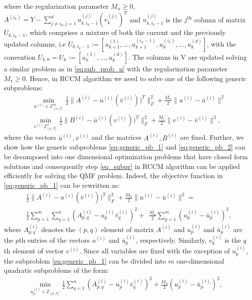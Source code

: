 \documentclass[lettersize,journal]{IEEEtran}
\begin{document}
where the regularization parameter $M_u \geq 0$,   $A^{(i_k)} = Y - \sum_{j \neq i_k, j=1}^d u_{k, i_k -1}^{(j)}  (v_k^{(j)})^T $ and  $u_{k, i_k -1}^{(j)}$ is the $j^{\text{th}}$ column of matrix $U_{k, i_k-1}$,  which comprises a mixture of both the current and the previously updated columns, i.e $U_{k, i_k-1} := [u_{k+1}^{(1)}, \ldots, u_{k+1}^{(i_k -1)}, u_{k}^{(i_k)}, \ldots , u_{k}^{(d)}]$, with the convention $U_{k, 0} = U_k:= [u_{k}^{(1)},\ldots, u_{k}^{(d)}]$. 
The columns in V are updated solving a similar problem as in \eqref{eq:sub_prob_u} with the regularization parameter $M_v \geq 0$. Hence, in RCCM algorithm we need to solve one of the following generic subproblems:
\begin{align}   
&\min_{u^{(i)} \in \mathbb{Z}_{[\alpha,\beta]}^{m}} \!\! \frac{1}{2} \|A^{(i)} \!- u^{(i)} (\bar v^{(i)}))^T \|_F^2 + \frac{M_u}{2} \| u^{(i)} \!- \bar{u}^{(i)} \|^2 \label{eq:generic_pb_1} \\
&\min_{v^{(i)} \mathbb{Z}_{[\alpha,\beta]}^{n}} \!\!  \frac{1}{2} \| B^{(i)} \!- \bar u^{(i)} (v^{(i)}))^T \|_F^2 + \frac{M_v}{2} \| v^{(i)} \!- \bar{v}^{(i)} \|^2, \label{eq:generic_pb_2}
\end{align}
where the vectors $\bar{u}^{(i)},\bar{v}^{(i)}$ and the matrices $ A^{(i)}, B^{(i)}$ are fixed.  Further, we show how the generic subproblems \eqref{eq:generic_pb_1}  and \eqref{eq:generic_pb_2} can be decomposed into one dimensional  optimization problems that have closed form solutions and consequently step \eqref{eq_subpr} in RCCM algorithm can be applied efficiently for solving the QMF problem.  Indeed, the objective function in \eqref{eq:generic_pb_1} can be rewritten as:
\begin{align*}
     &\frac{1}{2}\|A^{(i)} - u^{(i)} (\bar v^{(i)}))^T \|_F^2 + \frac{M_u}{2} \| u^{(i)} - \bar{u}^{(i)} \|^2 = \\
     & \frac{1}{2} \sum_{p=1}^{m} \sum_{q=1}^{n} \left( A_{p,q}^{(i)} -u^{(i)}_p \bar v^{(i)}_q \right)^2 +\ \ \frac{M_u}{2} \sum_{p=1}^{m}(u^{(i)}_p -\bar{u}^{(i)}_p)^2, 
\end{align*}
where $A_{p,q}^{(i)}$ denotes the $(p, q)$ element  of matrix $A^{(i)}$ and  $u_p^{(i)} $ and $\bar{u}_p^{(i)} $ are the $p$th entries of the vectors $u^{(i)}$ and $\bar{u}_p^{(i)}$, respectively.  Similarly, $v_q^{(i)} $ is the $q$th element of vector $v^{(i)}$.  Since all variables are fixed with the exception of $u_p^{(i)}$, the subproblem \eqref{eq:generic_pb_1} can be divided into $m$ one-dimensional  quadratic subproblems of the  form:
\begin{align} \label{eq:scalar_pb}
    \min_{u^{(i)}_p \in \mathbb{Z}_{[\alpha,\beta]}} \! \frac{1}{2} \! \sum_{q=1}^{n} \! \left( \! A_{p,q}^{(i)} \! -u^{(i)}_p \bar v^{(i)}_q \!\right)^2 \!+\! \frac{M_u}{2} (u^{(i)}_p \! -\bar{u}^{(i)}_p)^2,\,
\end{align}
\end{document}
